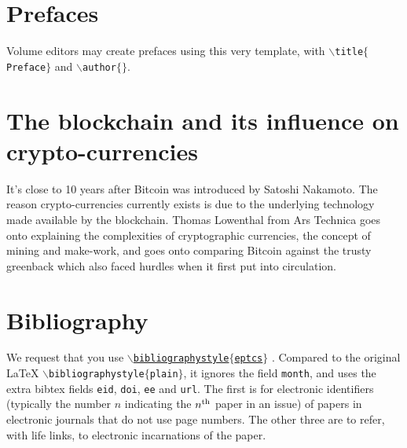 \documentclass[submission,copyright,creativecommons]{eptcs}
\begin{document}
\section{Prefaces}

Volume editors may create prefaces using this very template,
with {\tt $\backslash$title$\{$Preface$\}$} and {\tt $\backslash$author$\{\}$}.

\section{The blockchain and its influence on crypto-currencies}

It's close to 10 years after Bitcoin was introduced by Satoshi Nakamoto. The reason crypto-currencies currently exists is due to the underlying technology made available by the blockchain. Thomas Lowenthal from Ars Technica \cite{lowenthalBitcoinEncryptedPeertopeer2011} goes onto explaining the complexities of cryptographic currencies, the concept of mining and make-work, and goes onto comparing Bitcoin against the trusty greenback which also faced hurdles when it first put into circulation.

\section{Bibliography}

We request that you use
\href{http://www.cse.unsw.edu.au/~rvg/EPTCS/eptcs.bst}
{\tt $\backslash$bibliographystyle$\{$eptcs$\}$}
\cite{vidal_tokenizing_2017}. Compared to the original {\LaTeX}
{\tt $\backslash$biblio\-graphystyle$\{$plain$\}$},
it ignores the field {\tt month}, and uses the extra
bibtex fields {\tt eid}, {\tt doi}, {\tt ee} and {\tt url}.
The first is for electronic identifiers (typically the number $n$
indicating the $n^{\rm th}$ paper in an issue) of papers in electronic
journals that do not use page numbers. The other three are to refer,
with life links, to electronic incarnations of the paper.
\end{document}
